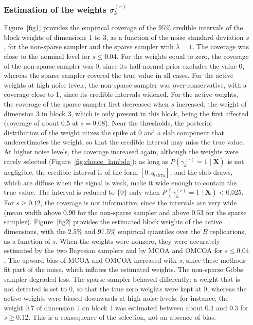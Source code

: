 \documentclass[11pt]{article}
\newcommand{\X}{\mathbf{X}}
\begin{document}
\subsubsection*{Estimation of the weights $\sigma_k^{(r)}$}
Figure~\ref{fig1} provides the empirical coverage of the 95\% credible intervals of the block weights of dimensions 1 to 3, as a function of the noise standard deviation $s$, for the non-sparse sampler and the sparse sampler with $\lambda=1$. The coverage was close to the nominal level for $s\leq0.04$. For the weights equal to zero, the coverage of the non-sparse sampler was 0, since its half-normal prior excludes the value 0, whereas the sparse sampler covered the true value in all cases. For the active weights at high noise levels, the non-sparse sampler was over-conservative, with a coverage close to 1, since its credible intervals widened. For the active weights, the coverage of the sparse sampler first decreased when $s$ increased, the weight of dimension 3 in block 3, which is only present in this block, being the first affected (coverage of about 0.5 at $s=0.08$). Near the thresholds, the posterior distribution of the weight mixes the spike at 0 and a slab component that underestimates the weight, so that the credible interval may miss the true value. At higher noise levels, the coverage increased again, although the weights were rarely selected (Figure~\ref{fig:choice_lambda}): as long as $P(\gamma_k^{(r)}=1\mid\X)$ is not negligible, the credible interval is of the form $[0,q_{0.975}]$, and the slab draws, which are diffuse when the signal is weak, make it wide enough to contain the true value. The interval is reduced to $\{0\}$ only when $P(\gamma_k^{(r)}=1\mid\X)<0.025$. For $s\geq 0.12$, the coverage is not informative, since the intervals are very wide (mean width above 0.90 for the non-sparse sampler and above 0.53 for the sparse sampler). Figure~\ref{fig2} provides the estimated block weights of the active dimensions, with the 2.5\% and 97.5\% empirical quantiles over the $B$ replications, as a function of $s$. When the weights were nonzero, they were accurately estimated by the two Bayesian samplers and by MCOA and OMCOA for $s\leq0.04$. The upward bias of MCOA and OMCOA increased with $s$, since these methods fit part of the noise, which inflates the estimated weights. The non-sparse Gibbs sampler degraded less. The sparse sampler behaved differently: a weight that is not detected is set to 0, so that the true zero weights were kept at 0, whereas the active weights were biased downwards at high noise levels; for instance, the weight $0.7$ of dimension 1 on block 1 was estimated between about $0.1$ and $0.3$ for $s\geq0.12$. This is a consequence of the selection, not an absence of bias.
\end{document}
